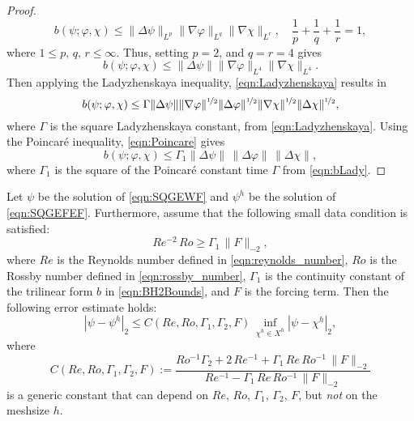 \begin{proof}
\begin{equation}
    b(\psi;\varphi,\chi) \le \|\Delta \psi\|_{L^p} \|\nabla \varphi\|_{L^q}
      \|\nabla \chi\|_{L^r},\quad \frac{1}{p}+\frac{1}{q}+\frac{1}{r}=1,
    \label{eqn:HolderB}
  \end{equation}
  where $1\le p,\,q,\,r\le \infty$. Thus, setting $p = 2$, and $q = r = 4$ gives
  \begin{equation*}
    b(\psi;\varphi,\chi) \le \|\Delta \psi\| \|\nabla \varphi\|_{L^4} \|\nabla
      \chi\|_{L^4}.
  \end{equation*}
  Then applying the Ladyzhenskaya inequality, \eqref{eqn:Ladyzhenskaya} results in
  \begin{equation}
    b(\psi;\varphi,\chi) \le \Gamma \|\Delta \psi\|
      \|\nabla \varphi\|^{\nicefrac{1}{2}} \|\Delta \varphi\|^{\nicefrac{1}{2}}
      \|\nabla \chi\|^{\nicefrac{1}{2}} \|\Delta \chi\|^{\nicefrac{1}{2}},
    \label{eqn:bLady}
  \end{equation}
  where $\Gamma$ is the square Ladyzhenskaya constant, from
  \eqref{eqn:Ladyzhenskaya}.  Using the Poincar\'e inequality,
  \eqref{eqn:Poincare} gives
  \begin{equation*}
    b(\psi;\varphi,\chi) \le \Gamma_1 \|\Delta \psi\|\, \|\Delta \varphi\|\,
      \|\Delta \chi\|,
  \end{equation*}
  where $\Gamma_1$ is the square of the Poincar\'e constant time $\Gamma$ from
  \eqref{eqn:bLady}.
\end{proof}

\begin{thm}
\label{thm:EnergyNorm}
  Let $\psi$ be the solution of \eqref{eqn:SQGEWF} and $\psi^h$ be the solution
  of \eqref{eqn:SQGEFEF}.
  Furthermore, assume that the following small data condition is satisfied:
  \begin{equation}
    Re^{-2} \, Ro \geq \Gamma_1 \, \| F \|_{-2} ,
    \label{eqn:small_data_condition}
  \end{equation}
  where $Re$ is the Reynolds number defined in \eqref{eqn:reynolds_number}, $Ro$
  is the Rossby number defined in \eqref{eqn:rossby_number}, $\Gamma_1$ is the
  continuity constant of the trilinear form $b$ in \eqref{eqn:BH2Bounds}, and $F$
  is the forcing term. Then the following error estimate holds:
  \begin{equation}
    |\psi - \psi^h|_2 \le C(Re, Ro, \Gamma_1, \Gamma_2, F) \,
      \inf_{\chi^h \in X^h} |\psi - \chi^h|_2 ,
    \label{eqn:EnergyNorm}
  \end{equation}
  where
  \begin{equation}
    C(Re, Ro, \Gamma_1, \Gamma_2, F)
      := \frac{ Ro^{-1} \Gamma_2 + 2 \, Re^{-1} + \Gamma_1 \, Re \, Ro^{-1} \,
        \| F \|_{-2} }
        { Re^{-1} - \Gamma_1 \, Re \, Ro^{-1} \, \| F \|_{-2} }
    \label{eqn:constant_definition}
  \end{equation}
  is a generic constant that can depend on $Re$, $Ro$, $\Gamma_1$, $\Gamma_2$, $F$, but
  \emph{not} on the meshsize $h$.
\end{thm}

